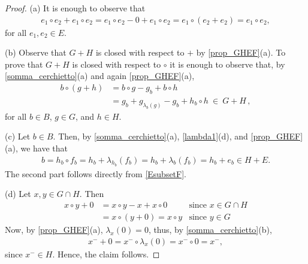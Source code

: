 \documentclass[11pt]{amsart}
\theoremstyle{definition}
\begin{document}
\begin{proof} (a) It is enough to observe that
        \begin{align*}
        e_1\circ e_2 +  e_1\circ e_2
        = e_1\circ e_2 - 0 +  e_1\circ e_2
            = e_1\circ(e_2 + e_2)
            =  e_1\circ e_2,
        \end{align*}
        for all $e_1,e_2\in E$.
        
        (b) Observe that $G+H$ is closed with respect to $+$ by \cref{prop_GHEF}(a). To prove that $G+H$ is closed with respect to $\circ$ it is enough to observe that, by \cref{somma_cerchietto}(a) and again \cref{prop_GHEF}(a),
        \begin{align*}
            b\circ(g+h)
            &= b\circ g - g_{b} 
            + b\circ h\\
            &= %
            g_b+g^{}_{\lambda_{b}(g)}-g_{b} + h_b\circ h
            \ \in \ G + H\,,
        \end{align*}
        for all $b\in B$, $g\in G$, and $h\in H$.
        
(c) Let $b\in B$. Then, by \cref{somma_cerchietto}(a), \cref{lambda1}(d), and \cref{prop_GHEF}(a), we have that
        \begin{align*}
            b=h_b \circ f_b=h_b+\lambda_{h_b}(f_b)=h_b+\lambda_b(f_b)=h_b+e_b \in H + E.
        \end{align*}
        The second part follows directly from \cref{EsubsetF}.
        
 (d)    Let $x,y\in G\cap H$. Then
\begin{align*}
    x\circ y + 0 
    &= x\circ y - x + x\circ 0 &\mbox{since $x\in G\cap H$}\\
    &= x\circ(y+0)
    = x\circ y&\mbox{since $y\in G$}
\end{align*}
Now, by \cref{prop_GHEF}(a), $\lambda_x(0)=0$, thus,  
by \cref{somma_cerchietto}(b),
\begin{align*}
    x^- + 0 = x^-\circ\lambda_x(0) = x^-\circ 0 = x^-,
\end{align*}
since $x^- \in H$. 
Hence, the claim follows.
\end{proof}
\end{document}
